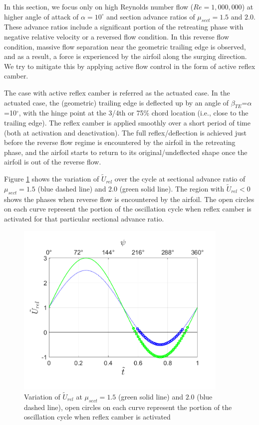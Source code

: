In this section, we focus only on high Reynolds number flow ($Re=1,000,000$) at higher angle of attack of $\alpha=10^\circ$ and section advance ratios of $\mu_{sect}= 1.5$ and $2.0$. 
These advance ratios include a significant portion of the retreating phase with negative relative velocity or a reversed flow condition. 
In this reverse flow condition, massive flow separation near the geometric trailing edge is observed, and as a result, a force is experienced by the airfoil along the surging direction. 
We try to mitigate this by applying active flow control in the form of active reflex camber. 

The case with active reflex camber is referred as the actuated case.
In the actuated case, the (geometric) trailing edge is deflected up by an angle of $\beta_{TE}$=$\alpha$=10$^\circ$, with the hinge point at the 3/4th or 75\% chord location (i.e., close to the trailing edge).
The reflex camber is applied smoothly over a short period of time (both at activation and deactivation).
The full reflex/deflection is achieved just before the reverse flow regime is encountered by the airfoil in the retreating phase, and the airfoil starts to return to its original/undeflected shape once the airfoil is out of the reverse flow.

Figure \ref{fig:U_rel} shows the variation of $\tilde{U}_{rel}$ over the cycle at sectional advance ratio of $\mu_{sect}=1.5$ (blue dashed line) and $2.0$ (green solid line).
The region with $\tilde{U}_{rel}<0$ shows the phases when reverse flow is encountered by the airfoil.
The open circles on each curve represent the portion of the oscillation cycle when reflex camber is activated for that particular sectional advance ratio.


\begin{figure}[H]
\centering
\texttt{}		\includegraphics[width=4in]{figures/U_rel_vs_t_tilde_without_lines.png}
		\caption{Variation of $\tilde{U}_{rel}$ at $\mu_{sect}=1.5$ (green solid line) and $2.0$ (blue dashed line), open circles on each curve represent the portion of the oscillation cycle when reflex camber is activated}
		\label{fig:U_rel}
\end{figure}



